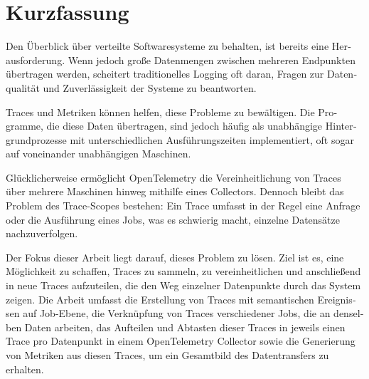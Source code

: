 \chapter{Kurzfassung}
\label{chap:kurzfassung}

\begin{german}
    Den Überblick über verteilte Softwaresysteme zu behalten, ist bereits eine Herausforderung.
    Wenn jedoch große Datenmengen zwischen mehreren Endpunkten übertragen werden,
    scheitert traditionelles Logging oft daran, Fragen zur Datenqualität und Zuverlässigkeit 
    der Systeme zu beantworten.
    
    Traces und Metriken können helfen, diese Probleme zu bewältigen.
    Die Programme, die diese Daten übertragen, sind jedoch häufig als
    unabhängige Hintergrundprozesse mit unterschiedlichen Ausführungszeiten
    implementiert, oft sogar auf voneinander unabhängigen Maschinen.
    
    Glücklicherweise ermöglicht OpenTelemetry die Vereinheitlichung von Traces über mehrere Maschinen
    hinweg mithilfe eines Collectors.
    Dennoch bleibt das Problem des Trace-Scopes bestehen:
    Ein Trace umfasst in der Regel eine Anfrage oder die Ausführung eines Jobs,
    was es schwierig macht, einzelne Datensätze nachzuverfolgen.
    
    Der Fokus dieser Arbeit liegt darauf, dieses Problem zu lösen.
    Ziel ist es, eine Möglichkeit zu schaffen, Traces zu sammeln, zu vereinheitlichen
    und anschließend in neue Traces aufzuteilen, die den Weg einzelner Datenpunkte durch das System zeigen.
    Die Arbeit umfasst die Erstellung von Traces mit semantischen Ereignissen auf
    Job-Ebene, die Verknüpfung von Traces verschiedener Jobs, die an denselben Daten arbeiten,
    das Aufteilen und Abtasten dieser Traces in jeweils einen Trace pro Datenpunkt in einem OpenTelemetry Collector
    sowie die Generierung von Metriken aus diesen Traces, um ein Gesamtbild des Datentransfers zu erhalten.
\end{german}
